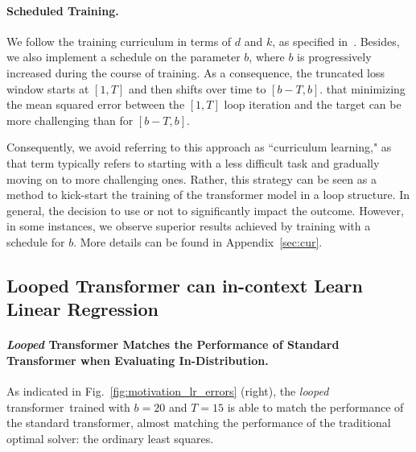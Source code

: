 \documentclass{article} %
\newcommand{\new}[1]{{\color{black}{#1}}}
\newcommand{\loopTF}{\emph{looped} transformer}
\theoremstyle{plain}
\theoremstyle{definition}
\theoremstyle{remark}
\begin{document}
\paragraph{Scheduled Training.} We follow the training curriculum in terms of $d$ and $k$, as specified in~\citet{Garg2022WhatCT}. 
Besides, we also implement a schedule on the parameter $b$, where $b$ is progressively increased during the course of training. As a consequence, the truncated loss window starts at $[1, T]$ and then shifts over time to $[b-T, b]$. \new{It is worth noting} that minimizing the mean squared error between the $[1, T]$ loop iteration and the target can be more challenging than for $[b-T, b]$.

Consequently, we avoid referring to this approach as ``curriculum learning," as that term typically refers to starting with a less difficult task and gradually moving on to more challenging ones. Rather, this strategy can be seen as a method to kick-start the training of the transformer model in a loop structure. In general, the decision to use or not to \new{use the scheduling does not} significantly impact the outcome. However, in some instances, we observe superior results achieved by training with a schedule for $b$. More details can be found in Appendix~\ref{sec:cur}.

\subsection{Looped Transformer can in-context Learn Linear Regression}\label{sec:LR_in_out_distribution}
\paragraph{\emph{Looped} Transformer Matches the Performance of Standard Transformer when Evaluating In-Distribution.} As indicated in Fig.~\ref{fig:motivation_lr_errors} (right), the \loopTF\ trained with $b=20$ and $T=15$ is able to match the performance of the standard transformer, almost matching the performance of the traditional optimal solver: the ordinary least squares. 
\end{document}
